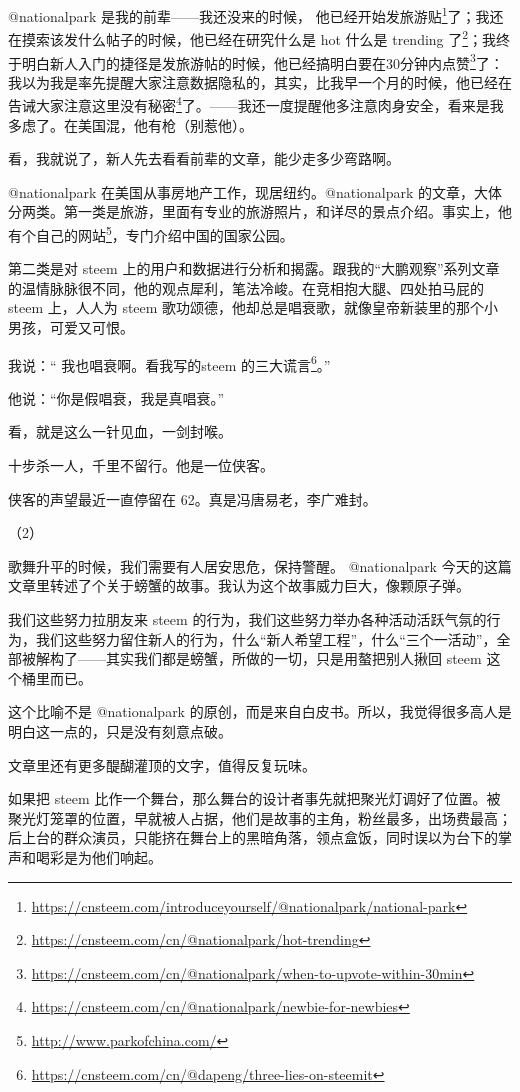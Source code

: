 \documentclass[]{ctexbook}
\renewcommand{\href}[2]{#2\footnote{\url{#1}}}
\begin{document}
@nationalpark 是我的前辈------我还没来的时候， 他已经开始\href{https://cnsteem.com/introduceyourself/@nationalpark/national-park}{发旅游贴}了；我还在摸索该发什么帖子的时候，他已经在研究\href{https://cnsteem.com/cn/@nationalpark/hot-trending}{什么是 hot 什么是 trending 了}；我终于明白新人入门的捷径是发旅游帖的时候，他已经搞明白要在\href{https://cnsteem.com/cn/@nationalpark/when-to-upvote-within-30min}{30分钟内点赞}了：我以为我是率先提醒大家注意数据隐私的，其实，比我早一个月的时候，他已经在告诫大家\href{https://cnsteem.com/cn/@nationalpark/newbie-for-newbies}{注意这里没有秘密}了。------我还一度提醒他多注意肉身安全，看来是我多虑了。在美国混，他有枪（别惹他）。

看，我就说了，新人先去看看前辈的文章，能少走多少弯路啊。

@nationalpark 在美国从事房地产工作，现居纽约。@nationalpark 的文章，大体分两类。第一类是旅游，里面有专业的旅游照片，和详尽的景点介绍。事实上，他有个\href{http://www.parkofchina.com/}{自己的网站}，专门介绍中国的国家公园。

第二类是对 steem 上的用户和数据进行分析和揭露。跟我的``大鹏观察''系列文章的温情脉脉很不同，他的观点犀利，笔法冷峻。在竞相抱大腿、四处拍马屁的 steem 上，人人为 steem 歌功颂德，他却总是唱衰歌，就像皇帝新装里的那个小男孩，可爱又可恨。

我说：`` 我也唱衰啊。看我写的\href{https://cnsteem.com/cn/@dapeng/three-lies-on-steemit}{steem 的三大谎言}。''

他说：``你是假唱衰，我是真唱衰。''

看，就是这么一针见血，一剑封喉。

十步杀一人，千里不留行。他是一位侠客。

侠客的声望最近一直停留在 62。真是冯唐易老，李广难封。

（2）

歌舞升平的时候，我们需要有人居安思危，保持警醒。 @nationalpark 今天的这篇文章里转述了个关于螃蟹的故事。我认为这个故事威力巨大，像颗原子弹。

我们这些努力拉朋友来 steem 的行为，我们这些努力举办各种活动活跃气氛的行为，我们这些努力留住新人的行为，什么``新人希望工程''，什么``三个一活动''，全部被解构了------其实我们都是螃蟹，所做的一切，只是用螯把别人揪回 steem 这个桶里而已。

这个比喻不是 @nationalpark 的原创，而是来自白皮书。所以，我觉得很多高人是明白这一点的，只是没有刻意点破。

文章里还有更多醍醐灌顶的文字，值得反复玩味。

如果把 steem 比作一个舞台，那么舞台的设计者事先就把聚光灯调好了位置。被聚光灯笼罩的位置，早就被人占据，他们是故事的主角，粉丝最多，出场费最高；后上台的群众演员，只能挤在舞台上的黑暗角落，领点盒饭，同时误以为台下的掌声和喝彩是为他们响起。
\end{document}
